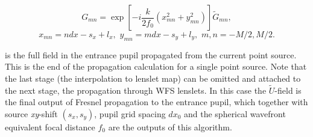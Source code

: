 \begin{enumerate}
\begin{itemize}
    \begin{equation} \label{eq:full-entrance-field}
      G_{mn} = \exp \left[ -i \frac{k}{2f_{0}} (x_{mn}^{2}+y_{mn}^{2}) \right]
      \tilde{G}_{mn},
    \end{equation}
    $$ x_{mn} = ndx - s_{x} + l_{x}, \,\, y_{mn} = mdx - s_{y} + l_{y},
       \,\, m,n = -M/2,M/2. $$
  \end{itemize}
  is the full field in the entrance pupil propagated from the current point
  source. This is the end of the propagation calculation for a single point
  source. Note that the last stage (the interpolation to lenslet map) can be
  omitted and attached to the next stage, the propagation through WFS
  lenslets. In this case the $\tilde{U}$-field is the final output of Fresnel
  propagation to the entrance pupil, which together with source
  \emph{xy}-shift $(s_{x},s_{y})$, pupil grid spacing $dx_{0}$ and the
  spherical wavefront equivalent focal distance $f_{0}$ are the outputs of this
  algorithm.
\end{enumerate}